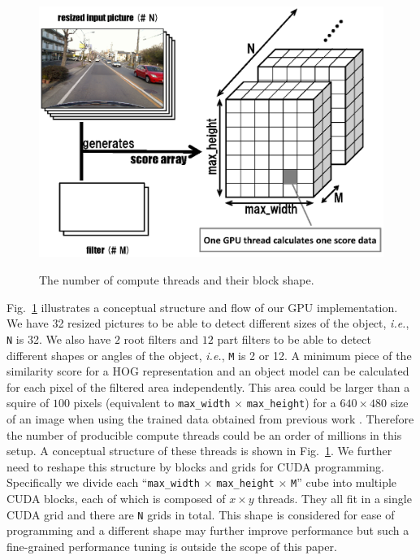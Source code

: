 \begin{figure}[t]
 \begin{center}
  \includegraphics[width=0.9\hsize]{fig/threads_shape.eps}\\
  \caption{The number of compute threads and their block shape.}
  \label{fig:threads_shape}
 \end{center}
\end{figure}

Fig.~\ref{fig:threads_shape} illustrates a conceptual structure and flow
of our GPU implementation.
We have 32 resized pictures to be able to detect different sizes of the
object, \textit{i.e.}, \texttt{N} is 32.
We also have $2$ root filters and $12$ part filters to be able to detect
different shapes or angles of the object, \textit{i.e.}, \texttt{M} is 2
or 12.
A minimum piece of the similarity score for a HOG representation and an
object model can be calculated for each pixel of the filtered area
independently.
This area could be larger than a squire of $100$ pixels (equivalent to
\texttt{max\_width} $\times$ \texttt{max\_height}) for a $640 \times 480$
size of an image when using the trained data obtained from previous work
\cite{Niknejad12}.
Therefore the number of producible compute threads could be an order of
millions in this setup.
A conceptual structure of these threads is shown in
Fig.~\ref{fig:threads_shape}.
We further need to reshape this structure by blocks and grids for CUDA
programming.
Specifically we divide each ``\texttt{max\_width} $\times$
\texttt{max\_height} $\times$ \texttt{M}'' cube into multiple CUDA
blocks, each of which is composed of $x \times y$ threads.
They all fit in a single CUDA grid and there are \texttt{N} grids in
total.
This shape is considered for ease of programming and a different shape
may further improve performance but such a fine-grained performance
tuning is outside the scope of this paper.

